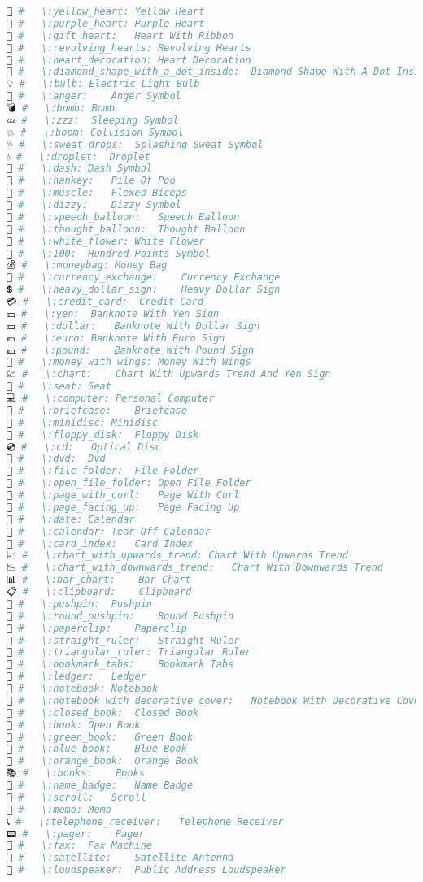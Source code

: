 \begin{lstlisting}[language=Julia, style=julia]
💛 #   \:yellow_heart: Yellow Heart
💜 #   \:purple_heart: Purple Heart
💝 #   \:gift_heart:   Heart With Ribbon
💞 #   \:revolving_hearts: Revolving Hearts
💟 #   \:heart_decoration: Heart Decoration
💠 #   \:diamond_shape_with_a_dot_inside:  Diamond Shape With A Dot Inside
💡 #   \:bulb: Electric Light Bulb
💢 #   \:anger:    Anger Symbol
💣 #   \:bomb: Bomb
💤 #   \:zzz:  Sleeping Symbol
💥 #   \:boom: Collision Symbol
💦 #   \:sweat_drops:  Splashing Sweat Symbol
💧 #   \:droplet:  Droplet
💨 #   \:dash: Dash Symbol
💩 #   \:hankey:   Pile Of Poo
💪 #   \:muscle:   Flexed Biceps
💫 #   \:dizzy:    Dizzy Symbol
💬 #   \:speech_balloon:   Speech Balloon
💭 #   \:thought_balloon:  Thought Balloon
💮 #   \:white_flower: White Flower
💯 #   \:100:  Hundred Points Symbol
💰 #   \:moneybag: Money Bag
💱 #   \:currency_exchange:    Currency Exchange
💲 #   \:heavy_dollar_sign:    Heavy Dollar Sign
💳 #   \:credit_card:  Credit Card
💴 #   \:yen:  Banknote With Yen Sign
💵 #   \:dollar:   Banknote With Dollar Sign
💶 #   \:euro: Banknote With Euro Sign
💷 #   \:pound:    Banknote With Pound Sign
💸 #   \:money_with_wings: Money With Wings
💹 #   \:chart:    Chart With Upwards Trend And Yen Sign
💺 #   \:seat: Seat
💻 #   \:computer: Personal Computer
💼 #   \:briefcase:    Briefcase
💽 #   \:minidisc: Minidisc
💾 #   \:floppy_disk:  Floppy Disk
💿 #   \:cd:   Optical Disc
📀 #   \:dvd:  Dvd
📁 #   \:file_folder:  File Folder
📂 #   \:open_file_folder: Open File Folder
📃 #   \:page_with_curl:   Page With Curl
📄 #   \:page_facing_up:   Page Facing Up
📅 #   \:date: Calendar
📆 #   \:calendar: Tear-Off Calendar
📇 #   \:card_index:   Card Index
📈 #   \:chart_with_upwards_trend: Chart With Upwards Trend
📉 #   \:chart_with_downwards_trend:   Chart With Downwards Trend
📊 #   \:bar_chart:    Bar Chart
📋 #   \:clipboard:    Clipboard
📌 #   \:pushpin:  Pushpin
📍 #   \:round_pushpin:    Round Pushpin
📎 #   \:paperclip:    Paperclip
📏 #   \:straight_ruler:   Straight Ruler
📐 #   \:triangular_ruler: Triangular Ruler
📑 #   \:bookmark_tabs:    Bookmark Tabs
📒 #   \:ledger:   Ledger
📓 #   \:notebook: Notebook
📔 #   \:notebook_with_decorative_cover:   Notebook With Decorative Cover
📕 #   \:closed_book:  Closed Book
📖 #   \:book: Open Book
📗 #   \:green_book:   Green Book
📘 #   \:blue_book:    Blue Book
📙 #   \:orange_book:  Orange Book
📚 #   \:books:    Books
📛 #   \:name_badge:   Name Badge
📜 #   \:scroll:   Scroll
📝 #   \:memo: Memo
📞 #   \:telephone_receiver:   Telephone Receiver
📟 #   \:pager:    Pager
📠 #   \:fax:  Fax Machine
📡 #   \:satellite:    Satellite Antenna
📢 #   \:loudspeaker:  Public Address Loudspeaker

\end{lstlisting}
